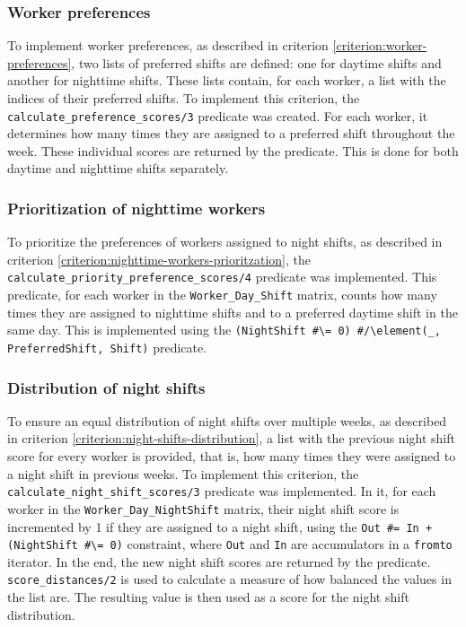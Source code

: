 \documentclass[conference]{IEEEtran}
\def\constraint#1{\vspace{4pt} {#1}}
\begin{document}
\constraint {
    \subsubsection*{Worker preferences}
    To implement worker preferences, as described in criterion \ref{criterion:worker-preferences}, two lists of preferred shifts are defined: one for daytime shifts and another for nighttime shifts. These lists contain, for each worker, a list with the indices of their preferred shifts.
    To implement this criterion, the \texttt{calculate\_preference\_scores/3} predicate was created. For each worker, it determines how many times they are assigned to a preferred shift throughout the week. These individual scores are returned by the predicate. This is done for both daytime and nighttime shifts separately.
}

\constraint {
    \subsubsection*{Prioritization of nighttime workers}
    To prioritize the preferences of workers assigned to night shifts, as described in criterion \ref{criterion:nighttime-workers-prioritzation}, the \texttt{calculate\_priority\_preference\_scores/4} predicate was implemented. This predicate, for each worker in the \texttt{Worker\_Day\_Shift} matrix, counts how many times they are assigned to nighttime shifts and to a preferred daytime shift in the same day. This is implemented using the \texttt{(NightShift \#\textbackslash= 0) \#/\textbackslash element(\_, PreferredShift, Shift)} predicate.
}

\constraint {
    \subsubsection*{Distribution of night shifts}
    To ensure an equal distribution of night shifts over multiple weeks, as described in criterion \ref{criterion:night-shifts-distribution}, a list with the previous night shift score for every worker is provided, that is, how many times they were assigned to a night shift in previous weeks.
    To implement this criterion, the \texttt{calculate\_night\_shift\_scores/3} predicate was implemented. In it, for each worker in the \texttt{Worker\_Day\_NightShift} matrix, their night shift score is incremented by 1 if they are assigned to a night shift, using the \texttt{Out \#= In + (NightShift \#\textbackslash= 0)} constraint, where \texttt{Out} and \texttt{In} are accumulators in a \texttt{fromto} iterator. In the end, the new night shift scores are returned by the predicate. \texttt{score\_distances/2} is used to calculate a measure of how balanced the values in the list are. The resulting value is then used as a score for the night shift distribution.
}
\end{document}
